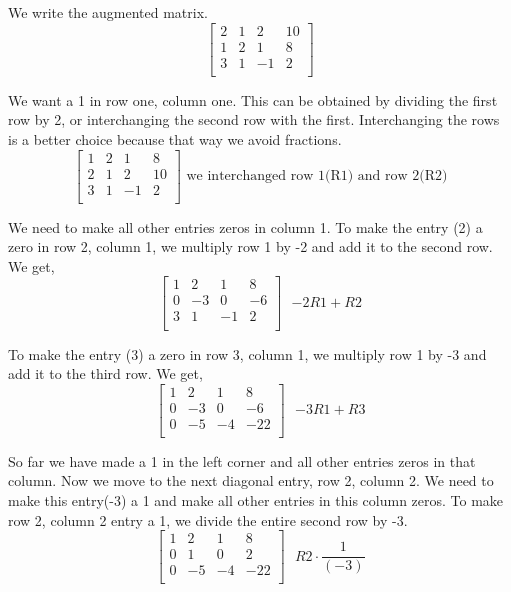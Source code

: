 \begin{solution}
    We write the augmented matrix.
    \[
        \left[ \begin{array}{ccc|c}
                2 & 1 & 2  & 10 \\
                1 & 2 & 1  & 8  \\
                3 & 1 & -1 & 2  \\
            \end{array} \right]
    \]

    We want a 1 in row one, column one. This can be obtained by dividing the first row by 2, or interchanging the second row with the first. Interchanging the rows is a better choice because that way we avoid fractions.
    \[
        \left[ \begin{array}{ccc|c}
                1 & 2 & 1  & 8  \\
                2 & 1 & 2  & 10 \\
                3 & 1 & -1 & 2  \\
            \end{array} \right] \text{ we interchanged row 1(R1) and row 2(R2)}
    \]

    We need to make all other entries zeros in column 1. To make the entry (2) a zero in row 2, column 1, we multiply row 1 by -2 and add it to the second row. We get,
    \[
        \left[ \begin{array}{ccc|c}
                1 & 2  & 1  & 8  \\
                0 & -3 & 0  & -6 \\
                3 & 1  & -1 & 2  \\
            \end{array} \right] \text{ $-2R1 + R2$}
    \]

    To make the entry (3) a zero in row 3, column 1, we multiply row 1 by -3 and add it to the third row. We get,
    \[
        \left[ \begin{array}{ccc|c}
                1 & 2  & 1  & 8   \\
                0 & -3 & 0  & -6  \\
                0 & -5 & -4 & -22 \\
            \end{array} \right] \text{ $-3R1 + R3$}
    \]

    So far we have made a 1 in the left corner and all other entries zeros in that column. Now we move to the next diagonal entry, row 2, column 2. We need to make this entry(-3) a 1 and make all other entries in this column zeros. To make row 2, column 2 entry a 1, we divide the entire second row by -3.
    \[
        \left[ \begin{array}{ccc|c}
                1 & 2  & 1  & 8   \\
                0 & 1  & 0  & 2   \\
                0 & -5 & -4 & -22 \\
            \end{array} \right] \text{ $R2 \cdot \frac{1}{(-3)}$}
    \]


\end{solution}

